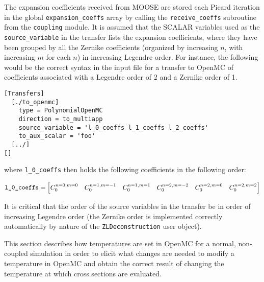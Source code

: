 \documentclass[10pt]{article}
\newcommand{\beq}{\begin{equation}}
\newcommand{\eeq}{\end{equation}}
\newcounter{subsubsubsection}[subsubsection]
\numberwithin{equation}{section} %
\begin{document}
The expansion coefficients received from MOOSE are stored each Picard iteration in the global {\tt expansion\_coeffs} array by calling the {\tt receive\_coeffs} subroutine from the {\tt coupling} module. It is assumed that the SCALAR variables used as the {\tt source\_variable} in the transfer lists the expansion coefficients, where they have been grouped by all the Zernike coefficients (organized by increasing \(n\), with increasing \(m\) for each \(n\)) in increasing Legendre order. For instance, the following would be the correct syntax in the input file for a transfer to OpenMC of coefficients associated with a Legendre order of 2 and a Zernike order of 1.

\begin{lstlisting}
[Transfers]
  [./to_openmc]
    type = PolynomialOpenMC
    direction = to_multiapp
    source_variable = 'l_0_coeffs l_1_coeffs l_2_coeffs'
    to_aux_scalar = 'foo'
  [../]
[]
\end{lstlisting}

where {\tt l\_0\_coeffs} then holds the following coefficients in the following order:

\beq
\textrm{{\tt l\_0\_coeffs}}= \begin{bmatrix}C_0^{n=0,m=0} & C_0^{n=1, m=-1} & C_0^{n=1,m=1} & C_0^{n=2,m=-2} & C_0^{n=2,m=0} & C_0^{n=2,m=2}\end{bmatrix}
\eeq

It is critical that the order of the source variables in the transfer be in order of increasing Legendre order (the Zernike order is implemented correctly automatically by nature of the {\tt ZLDeconstruction} user object). 

This section describes how temperatures are set in OpenMC for a normal, non-coupled simulation in order to elicit what changes are needed to modify a temperature in OpenMC and obtain the correct result of changing the temperature at which cross sections are evaluated.
\end{document}
